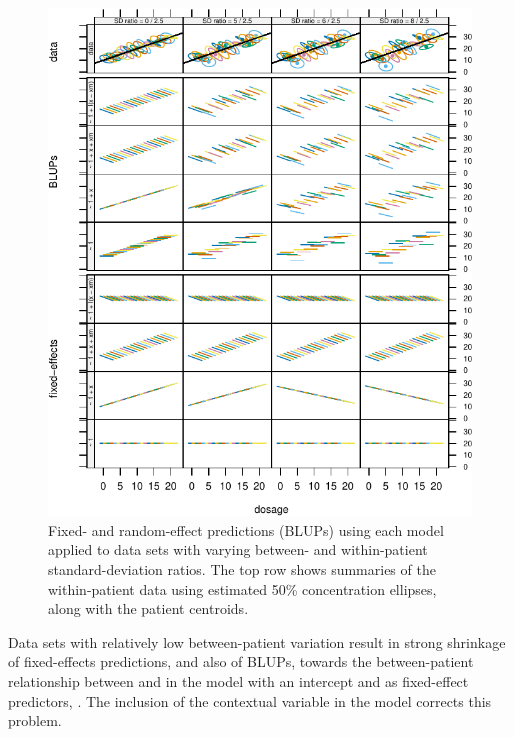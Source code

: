 \documentclass[
]{jss}
\begin{document}
\begin{CodeChunk}
\begin{figure}

{\centering \includegraphics[width=1\linewidth]{jss5535_files/figure-latex/plot-fits-combined-1}

}

\caption[Fixed- and random-effect predictions (BLUPs) using each model applied to data sets with varying between- and within-patient standard-deviation ratios]{Fixed- and random-effect predictions (BLUPs) using each model applied to data sets with varying between- and within-patient standard-deviation ratios. The top row shows summaries of the within-patient data using estimated 50\% concentration ellipses, along with the patient centroids.}\label{fig:plot-fits-combined}
\end{figure}
\end{CodeChunk}

Data sets with relatively low between-patient variation result in strong
shrinkage of fixed-effects predictions, and also of BLUPs, towards the
between-patient relationship between  and  in the model
with an intercept and  as fixed-effect predictors,
. The inclusion of the contextual variable  in
the model corrects this problem.
\end{document}
